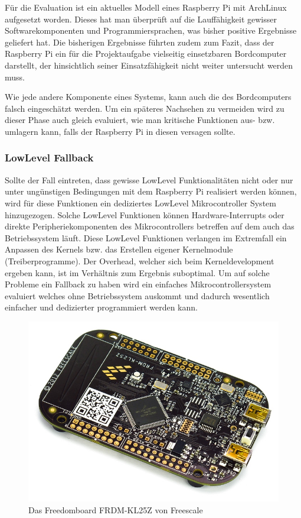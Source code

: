 Für die Evaluation ist ein aktuelles Modell eines Raspberry Pi mit
ArchLinux aufgesetzt worden. Dieses hat man überprüft auf die 
Lauffähigkeit gewisser Softwarekomponenten und Programmiersprachen,
was bisher positive Ergebnisse geliefert hat. Die bisherigen Ergebnisse
führten zudem zum Fazit, dass der Raspberry Pi ein für die Projektaufgabe
vielseitig einsetzbaren Bordcomputer darstellt, der hinsichtlich seiner
Einsatzfähigkeit nicht weiter untersucht werden muss.

Wie jede andere Komponente eines Systems, kann auch die des Bordcomputers
falsch eingeschätzt werden. Um ein späteres Nachsehen zu vermeiden wird
zu dieser Phase auch gleich evaluiert, wie man kritische Funktionen
aus- bzw. umlagern kann, falls der Raspberry Pi in diesen versagen sollte.

\subsubsection{LowLevel Fallback}
\label{ssc_lowlevel_fallback}
Sollte der Fall eintreten, dass gewisse LowLevel Funktionalitäten nicht
oder nur unter ungünstigen Bedingungen mit dem Raspberry Pi realisiert 
werden können, wird für diese Funktionen ein dediziertes LowLevel 
Mikrocontroller System hinzugezogen. Solche LowLevel Funktionen können
Hardware-Interrupts oder direkte Peripheriekomponenten des Mikrocontrollers
betreffen auf dem auch das Betriebssystem läuft. Diese LowLevel Funktionen
verlangen im Extremfall ein Anpassen des Kernels bzw. das Erstellen eigener
Kernelmodule (Treiberprogramme). Der Overhead, welcher sich beim 
Kerneldevelopment ergeben kann, ist im Verhältnis zum Ergebnis suboptimal. 
Um auf solche Probleme ein Fallback zu haben wird ein einfaches 
Mikrocontrollersystem evaluiert welches ohne Betriebssystem auskommt und
dadurch wesentlich einfacher und dedizierter programmiert werden kann.

\begin{figure}[h!]
	\centering
	\includegraphics[scale=1]{../../fig/frdm-kl25z.jpg}
	\caption{Das Freedomboard FRDM-KL25Z von Freescale}
\end{figure}

